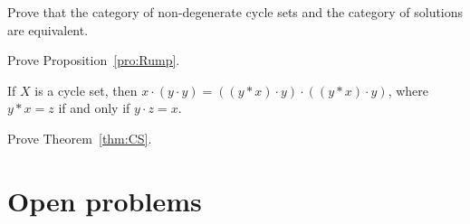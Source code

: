 
\begin{prob}
\label{prob:cycle_sets}
Prove that the category of non-degenerate 
cycle sets and the category of solutions are equivalent. 
\end{prob}

\begin{prob}
\label{prob:Rump}
Prove Proposition~\ref{pro:Rump}. 
\end{prob}

\begin{prob}
If $X$ is a cycle set, then $x\cdot (y\cdot y)=((y*x)\cdot y)\cdot ((y*x)\cdot y)$, where
$y*x=z$ if and only if $y\cdot z=x$. 
\end{prob}

\begin{prob}
\label{prob:CS}
Prove Theorem~\ref{thm:CS}. 
\end{prob}

\section*{Open problems}



